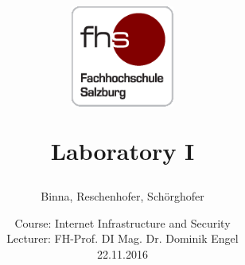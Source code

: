 \documentclass[
a4paper,     %
11pt         %
]{scrartcl}  %
\title{
	\begin{figure}[!ht]
		\centering
		\includegraphics[width=0.3\textwidth]{fhs_logo_web.png}
	\end{figure}
	\vspace{2cm}
	\Huge Laboratory I
}
\begin{document}

 \thispagestyle{empty}  %
 	\vspace{1cm}
 	
 	\author{Binna, Reschenhofer, Schörghofer}
 	\vspace{1cm}
 	
 	
 	\date{
 		\large Course: Internet Infrastructure and Security \\ 
 		\vspace{0.8cm}
 		\large Lecturer: FH-Prof. DI Mag. Dr. Dominik Engel \\
 		\vspace{1cm}
 		\large 22.11.2016
 	}
 \maketitle
 

\newpage
\vfill
\hypersetup{linkcolor=black}
 \tableofcontents



 \newpage
 \setcounter{section}{0} %
 \setcounter{page}{1}
 \setcounter{secnumdepth}{5}
 
 \renewcommand{\thesection}{\arabic{section}}
 \renewcommand{\thesubsection}{\thesection.\arabic{subsection}}

\setlength{\parindent}{0pt}


\setlength{\bibsep}{3mm}

\end{document}
